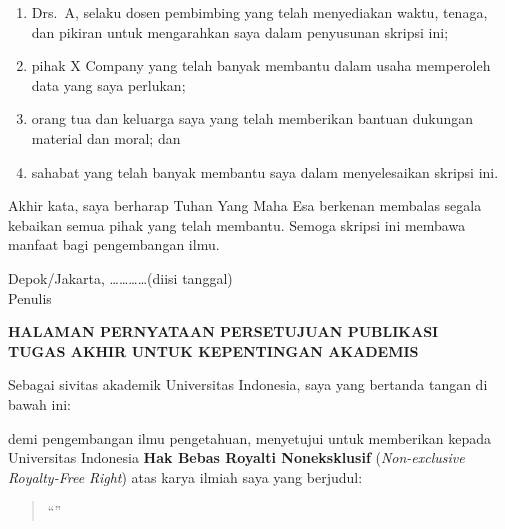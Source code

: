 \documentclass[main]{subfiles}
\begin{document}
\begin{enumerate}
  \item Drs.\ A, selaku dosen pembimbing yang telah menyediakan waktu, tenaga,
        dan pikiran untuk mengarahkan saya dalam penyusunan skripsi ini;
  \item pihak X Company yang telah banyak membantu dalam usaha memperoleh data
        yang saya perlukan;
  \item orang tua dan keluarga saya yang telah memberikan bantuan dukungan
        material dan moral; dan
  \item sahabat yang telah banyak membantu saya dalam menyelesaikan skripsi ini.
\end{enumerate}

\noindent Akhir kata, saya berharap Tuhan Yang Maha Esa berkenan membalas segala
kebaikan semua pihak yang telah membantu. Semoga skripsi ini membawa manfaat
bagi pengembangan ilmu.
\vspace{1cm}

\begin{flushright}
Depok/Jakarta, \ldots\ldots\ldots\ldots (diisi tanggal)\\[1.5cm]
Penulis
\end{flushright}

\clearpage
\begin{center}\bfseries
HALAMAN PERNYATAAN PERSETUJUAN PUBLIKASI\\
TUGAS AKHIR UNTUK KEPENTINGAN AKADEMIS\end{center}
\vspace{0.8cm}
\onehalfspacing
\noindent Sebagai sivitas akademik Universitas Indonesia, saya yang bertanda
tangan di bawah ini:
\vspace{0.4cm}

\vspace{0.4cm}

\noindent demi pengembangan ilmu pengetahuan, menyetujui untuk memberikan kepada
Universitas Indonesia \textbf{Hak Bebas Royalti Noneksklusif}
(\textit{Non-exclusive Royalty-Free Right}) atas karya ilmiah saya yang berjudul:
\vspace{0.4cm}

\begin{quote}
``\juduluppercase''
\end{quote}
\vspace{0.2cm}
\end{document}
